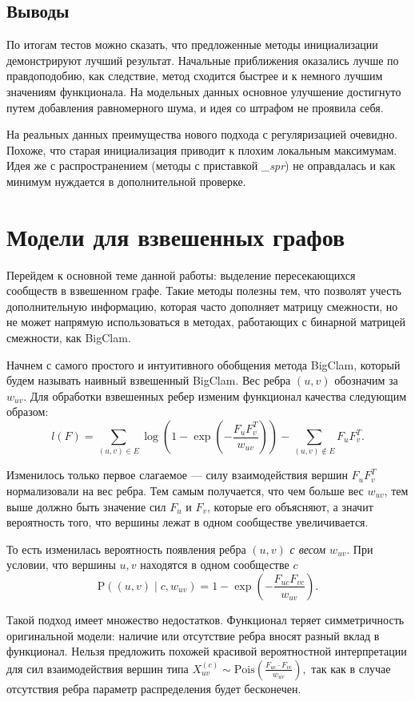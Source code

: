 \documentclass{ITaSconf}
\def\PP{\mathrm{P}}
\begin{document}
\subsection{Выводы} 
По итогам тестов можно сказать, что предложенные методы инициализации демонстрируют лучший результат. 
Начальные приближения оказались лучше по правдоподобию, как следствие, метод сходится быстрее и к немного лучшим значениям функционала. 
На модельных данных основное улучшение достигнуто путем добавления равномерного шума, и идея со штрафом не проявила себя.

На реальных данных преимущества нового подхода с регуляризацией очевидно. 
Похоже, что старая инициализация приводит к плохим локальным максимумам. 
Идея же с распространением (методы с приставкой \textit{\_spr}) не оправдалась и как минимум нуждается в дополнительной проверке.

\section{Модели для взвешенных графов}

Перейдем к основной теме данной работы: выделение пересекающихся сообществ в взвешенном графе. 
Такие методы полезны тем, что позволят учесть дополнительную информацию, которая часто дополняет матрицу смежности, но не может напрямую использоваться в методах, работающих с бинарной матрицей смежности, как BigClam.

Начнем с самого простого и интуитивного обобщения метода BigClam, который будем называть наивный взвешенный BigClam.
Вес ребра $(u,v)$ обозначим за $w_{uv}$. 
Для обработки взвешенных ребер изменим функционал качества следующим образом:
$$l(F) = \sum_{(u,v)\in E} \log\left(1 - \exp\left( - \dfrac{F_{u} F_{v}^T}{w_{uv}}\right)\right) - \sum_{(u,v) \notin E} F_{u} F_{v}^T.$$

Изменилось только первое слагаемое --- силу взаимодействия вершин $F_u F_v^T$ нормализовали на вес ребра.
Тем самым получается, что чем больше вес $w_{uv}$, тем выше должно быть значение сил $F_u$ и $F_v$, которые его объясняют, а значит вероятность того, что вершины лежат в одном сообществе увеличивается.

То есть изменилась вероятность появления ребра $(u,v)$ \textit{с весом $w_{uv}$}. При условии, что вершины $u,v$ находятся в одном сообществе $c$
$$\PP((u,v) \mid c, w_{uv})=1 - \exp\left(-\dfrac{F_{uc} F_{vc}}{w_{uv}}\right).$$

Такой подход имеет множество недостатков.
Функционал теряет симметричность оригинальной модели: наличие или отсутствие ребра вносят разный вклад в функционал. 
Нельзя предложить похожей красивой вероятностной интерпретации для сил взаимодействия вершин типа $ X_{uv}^{(c)} \sim \mathrm{Pois}\left(\frac{F_{uc} \cdot F_{vc}}{w_{uv}}\right),$
так как в случае отсутствия ребра параметр распределения будет бесконечен.
\end{document}
